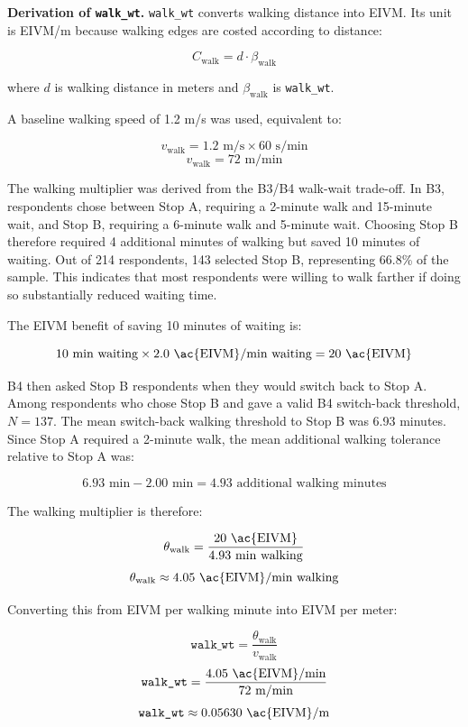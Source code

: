 {\noindent\textbf{Derivation of \texttt{walk\_wt}.}
\texttt{walk\_wt} converts walking distance into \ac{EIVM}. Its unit is \ac{EIVM}/m because walking edges are costed according to distance:

\[
C_{\text{walk}} = d \cdot \beta_{\text{walk}}
\]

where $d$ is walking distance in meters and $\beta_{\text{walk}}$ is \texttt{walk\_wt}.

A baseline walking speed of 1.2 m/s was used, equivalent to:

\[
v_{\text{walk}} = 1.2 \text{ m/s} \times 60 \text{ s/min}
\]
\[
v_{\text{walk}} = 72 \text{ m/min}
\]

The walking multiplier was derived from the B3/B4 walk-wait trade-off. In B3, respondents chose between Stop A, requiring a 2-minute walk and 15-minute wait, and Stop B, requiring a 6-minute walk and 5-minute wait. Choosing Stop B therefore required 4 additional minutes of walking but saved 10 minutes of waiting. Out of 214 respondents, 143 selected Stop B, representing 66.8\% of the sample. This indicates that most respondents were willing to walk farther if doing so substantially reduced waiting time.

The \ac{EIVM} benefit of saving 10 minutes of waiting is:

\[
10 \text{ min waiting} \times 2.0 \text{ \ac{EIVM}/min waiting} = 20 \text{ \ac{EIVM}}
\]

B4 then asked Stop B respondents when they would switch back to Stop A. Among respondents who chose Stop B and gave a valid B4 switch-back threshold, $N = 137$. The mean switch-back walking threshold to Stop B was 6.93 minutes. Since Stop A required a 2-minute walk, the mean additional walking tolerance relative to Stop A was:

\[
6.93 \text{ min} - 2.00 \text{ min} = 4.93 \text{ additional walking minutes}
\]

The walking multiplier is therefore:

\[
\theta_{\text{walk}} = \frac{20 \text{ \ac{EIVM}}}{4.93 \text{ min walking}}
\]
\[
\theta_{\text{walk}} \approx 4.05 \text{ \ac{EIVM}/min walking}
\]

Converting this from \ac{EIVM} per walking minute into \ac{EIVM} per meter:

\[
\texttt{walk\_wt} = \frac{\theta_{\text{walk}}}{v_{\text{walk}}}
\]
\[
\texttt{walk\_wt} = \frac{4.05 \text{ \ac{EIVM}/min}}{72 \text{ m/min}}
\]
\[
\texttt{walk\_wt} \approx 0.05630 \text{ \ac{EIVM}/m}
\]

}
